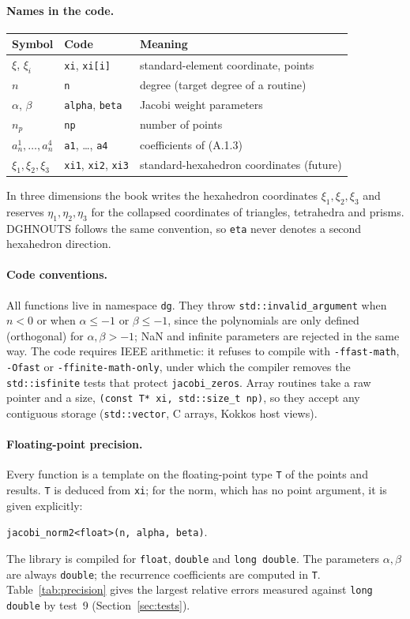 \documentclass[11pt,a4paper]{article}
\newcommand{\code}[1]{\texttt{#1}}
\begin{document}
\paragraph{Names in the code.}
\begin{center}
\begin{tabular}{@{}lll@{}}
\toprule
Symbol & Code & Meaning \\
\midrule
$\xi$, $\xi_i$ & \code{xi}, \code{xi[i]} & standard-element coordinate, points \\
$n$ & \code{n} & degree (target degree of a routine) \\
$\alpha$, $\beta$ & \code{alpha}, \code{beta} & Jacobi weight parameters \\
$n_p$ & \code{np} & number of points \\
$a_n^1,\dots,a_n^4$ & \code{a1}, \dots, \code{a4} & coefficients of (A.1.3) \\
$\xi_1,\xi_2,\xi_3$ & \code{xi1}, \code{xi2}, \code{xi3} & standard-hexahedron coordinates (future) \\
\bottomrule
\end{tabular}
\end{center}
In three dimensions the book writes the hexahedron coordinates
$\xi_1,\xi_2,\xi_3$ and reserves $\eta_1,\eta_2,\eta_3$ for the collapsed
coordinates of triangles, tetrahedra and prisms. DGHNOUTS follows the same
convention, so \code{eta} never denotes a second hexahedron direction.

\paragraph{Code conventions.}
All functions live in namespace \code{dg}. They throw
\code{std::invalid\_argument} when $n<0$ or when $\alpha\le-1$ or
$\beta\le-1$, since the polynomials are only defined (orthogonal) for
$\alpha,\beta>-1$; NaN and infinite parameters are rejected in the same way.
The code requires IEEE arithmetic: it refuses to compile with
\code{-ffast-math}, \code{-Ofast} or \code{-ffinite-math-only}, under which
the compiler removes the \code{std::isfinite} tests that protect
\code{jacobi\_zeros}. Array routines take a raw pointer and a size,
\code{(const T* xi, std::size\_t np)}, so they accept any contiguous storage
(\code{std::vector}, C arrays, Kokkos host views).

\paragraph{Floating-point precision.}
\label{sec:precision}
Every function is a template on the floating-point type \code{T} of the points
and results. \code{T} is deduced from \code{xi}; for the norm, which has no
point argument, it is given explicitly:
\begin{center}
\code{jacobi\_norm2<float>(n, alpha, beta)}.
\end{center}
The library is compiled for \code{float}, \code{double} and \code{long double}. The
parameters $\alpha,\beta$ are always \code{double}; the recurrence
coefficients are computed in \code{T}. Table~\ref{tab:precision} gives the
largest relative errors measured against \code{long double} by test~9
(Section~\ref{sec:tests}).
\end{document}
